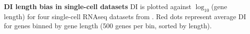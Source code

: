\textbf{DI length bias in single-cell datasets} DI is plotted against $\log_{10}$(gene length) for four single-cell RNAseq datasets from \citep{Zeisel_2015,Tasic_2016,Zeisel_2018,Saunders_2018}. Red dots represent average DI for genes binned by gene length (500 genes per bin, sorted by length).

